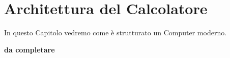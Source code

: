 \chapter{Architettura del Calcolatore}

In questo Capitolo vedremo come è strutturato un Computer moderno.

\textbf{da completare}
